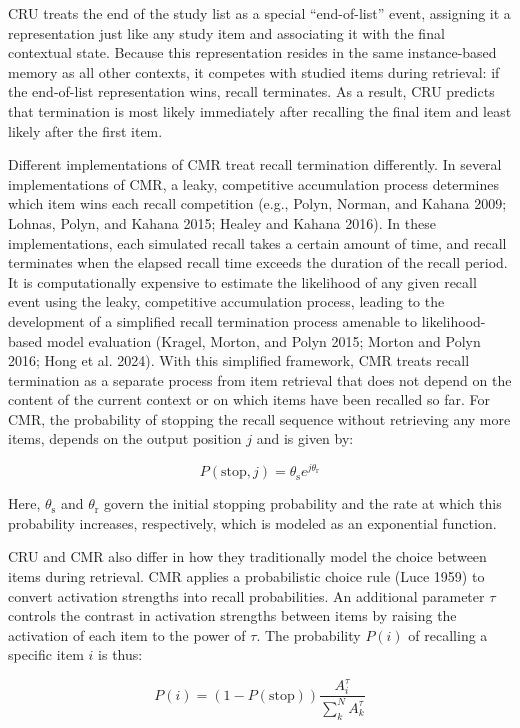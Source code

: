 \documentclass[
  letterpaper,
  DIV=11,
  numbers=noendperiod]{scrartcl}
\begin{document}
CRU treats the end of the study list as a special ``end-of-list'' event,
assigning it a representation just like any study item and associating
it with the final contextual state. Because this representation resides
in the same instance-based memory as all other contexts, it competes
with studied items during retrieval: if the end-of-list representation
wins, recall terminates. As a result, CRU predicts that termination is
most likely immediately after recalling the final item and least likely
after the first item.

Different implementations of CMR treat recall termination differently.
In several implementations of CMR, a leaky, competitive accumulation
process determines which item wins each recall competition (e.g., Polyn,
Norman, and Kahana 2009; Lohnas, Polyn, and Kahana 2015; Healey and
Kahana 2016). In these implementations, each simulated recall takes a
certain amount of time, and recall terminates when the elapsed recall
time exceeds the duration of the recall period. It is computationally
expensive to estimate the likelihood of any given recall event using the
leaky, competitive accumulation process, leading to the development of a
simplified recall termination process amenable to likelihood-based model
evaluation (Kragel, Morton, and Polyn 2015; Morton and Polyn 2016; Hong
et al. 2024). With this simplified framework, CMR treats recall
termination as a separate process from item retrieval that does not
depend on the content of the current context or on which items have been
recalled so far. For CMR, the probability of stopping the recall
sequence without retrieving any more items, depends on the output
position \(j\) and is given by:

\[
P(\text{stop}, j) = \theta_\text{s} e^{j\theta_\text{r}}
\]

Here, \(\theta_\text{s}\) and \(\theta_\text{r}\) govern the initial
stopping probability and the rate at which this probability increases,
respectively, which is modeled as an exponential function.

CRU and CMR also differ in how they traditionally model the choice
between items during retrieval. CMR applies a probabilistic choice rule
(Luce 1959) to convert activation strengths into recall probabilities.
An additional parameter \(\tau\) controls the contrast in activation
strengths between items by raising the activation of each item to the
power of \(\tau\). The probability \(P(i)\) of recalling a specific item
\(i\) is thus:

\[
P(i) = (1-P(\text{stop}))\frac{A^{\tau}_i}{\sum_{k}^{N}A^{\tau}_k}
\]
\end{document}
